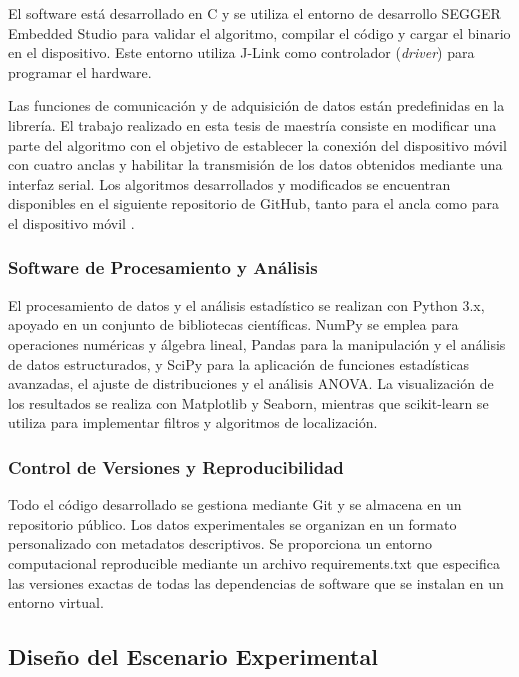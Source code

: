 El software está desarrollado en C y se utiliza el entorno de desarrollo SEGGER Embedded Studio para validar el algoritmo, compilar el código y cargar el binario en el dispositivo. Este entorno utiliza J-Link como controlador (\textit{driver}) para programar el hardware.

Las funciones de comunicación y de adquisición de datos están predefinidas en la librería. El trabajo realizado en esta tesis de maestría consiste en modificar una parte del algoritmo con el objetivo de establecer la conexión del dispositivo móvil con cuatro anclas y habilitar la transmisión de los datos obtenidos mediante una interfaz serial. Los algoritmos desarrollados y modificados se encuentran disponibles en el siguiente repositorio de GitHub, tanto para el ancla como para el dispositivo móvil \cite{DiazAlgoritmosUWB}.

\subsubsection{Software de Procesamiento y Análisis}

El procesamiento de datos y el análisis estadístico se realizan con Python 3.x, apoyado en un conjunto de bibliotecas científicas. NumPy se emplea para operaciones numéricas y álgebra lineal, Pandas para la manipulación y el análisis de datos estructurados, y SciPy para la aplicación de funciones estadísticas avanzadas, el ajuste de distribuciones y el análisis ANOVA. La visualización de los resultados se realiza con Matplotlib y Seaborn, mientras que scikit-learn se utiliza para implementar filtros y algoritmos de localización.

\subsubsection{Control de Versiones y Reproducibilidad}

Todo el código desarrollado se gestiona mediante Git y se almacena en un repositorio público. Los datos experimentales se organizan en un formato personalizado con metadatos descriptivos. Se proporciona un entorno computacional reproducible mediante un archivo requirements.txt que especifica las versiones exactas de todas las dependencias de software que se instalan en un entorno virtual.

\subsection{Diseño del Escenario Experimental}
\label{subsec:diseno_escenario}

